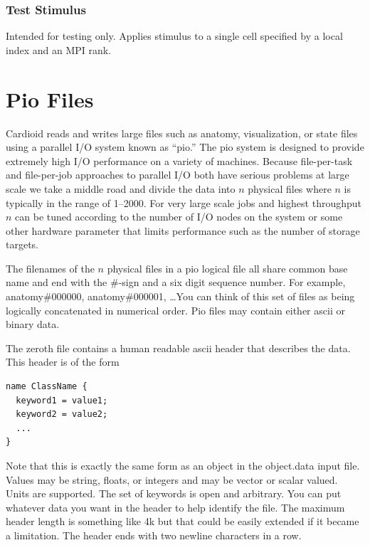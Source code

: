 \documentclass{article}
\begin{document}
\subsubsection{Test Stimulus}
Intended for testing only.  Applies stimulus to a single cell specified
by a local index and an MPI rank.

\begin{keywords}
\end{keywords}


\section{Pio Files}
\label{sec:pio}

Cardioid reads and writes large files such as anatomy, visualization, or
state files using a parallel I/O system known as ``pio.''  The pio
system is designed to provide extremely high I/O performance on a
variety of machines.  Because file-per-task and file-per-job approaches
to parallel I/O both have serious problems at large scale we take a
middle road and divide the data into $n$ physical files where $n$ is
typically in the range of 1--2000.  For very large scale jobs and
highest throughput $n$ can be tuned according to the number of I/O nodes
on the system or some other hardware parameter that limits performance
such as the number of storage targets.


The filenames of the $n$ physical files in a pio logical file all share
common base name and end with the \#-sign and a six digit sequence
number.  For example, anatomy\#000000, anatomy\#000001, \ldots You can
think of this set of files as being logically concatenated in numerical
order.  Pio files may contain either ascii or binary data.

The zeroth file contains a human readable ascii header that describes
the data.  This header is of the form
\begin{verbatim}
name ClassName { 
  keyword1 = value1; 
  keyword2 = value2;
  ...
}
\end{verbatim}
Note that this is exactly the same form as an object in the object.data
input file.  Values may be string, floats, or integers and may be vector
or scalar valued.  Units are supported.  The set of keywords is open and
arbitrary.  You can put whatever data you want in the header to help
identify the file.  The maximum header length is something like 4k but
that could be easily extended if it became a limitation.  The header
ends with two newline characters in a row.  
\end{document}
